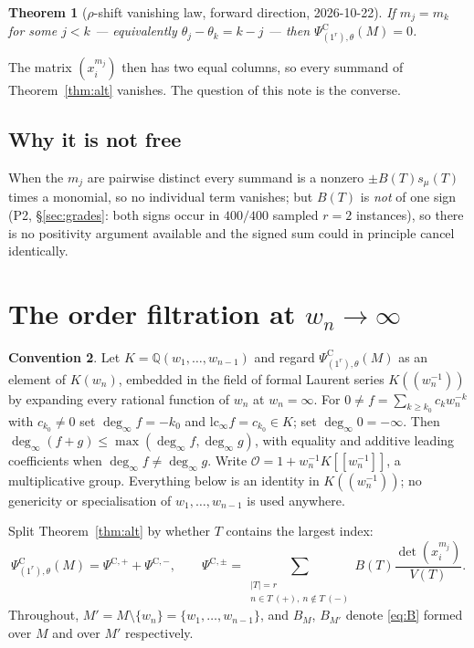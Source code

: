 \documentclass[11pt]{article}
\newtheorem{theorem}{Theorem}
\theoremstyle{definition}
\newtheorem{convention}[theorem]{Convention}
\newcommand{\PsiC}{\Psi^{\mathrm{C}}}
\newcommand{\PsiCs}[1]{\Psi^{\mathrm{C},#1}}
\newcommand{\degi}{\deg_{\infty}}
\begin{document}
\begin{theorem}[$\rho$-shift vanishing law, forward direction, 2026-10-22]\label{thm:vanish}
If $m_j=m_k$ for some $j<k$ --- equivalently $\theta_j-\theta_k=k-j$ --- then
$\PsiC_{(1^r),\theta}(M)=0$.
\end{theorem}

\noindent The matrix $(x_i^{m_j})$ then has two equal columns, so every summand of
Theorem~\ref{thm:alt} vanishes. The question of this note is the converse.

\subsection{Why it is not free}

When the $m_j$ are pairwise distinct every summand is a nonzero $\pm B(T)s_\mu(T)$ times a
monomial, so no individual term vanishes; but $B(T)$ is \emph{not} of one sign
(P2, \S\ref{sec:grades}: both signs occur in $400/400$ sampled $r=2$ instances), so there is
no positivity argument available and the signed sum could in principle cancel identically.

\section{The order filtration at $w_n\to\infty$}

\begin{convention}\label{conv:ord}
Let $K=\mathbb{Q}(w_1,\dots,w_{n-1})$ and regard $\PsiC_{(1^r),\theta}(M)$ as an element of
$K(w_n)$, embedded in the field of formal Laurent series $K((w_n^{-1}))$ by expanding every
rational function of $w_n$ at $w_n=\infty$. For $0\ne f=\sum_{k\ge k_0}c_kw_n^{-k}$ with
$c_{k_0}\ne0$ set $\degi f=-k_0$ and $\mathrm{lc}_\infty f=c_{k_0}\in K$; set
$\degi 0=-\infty$. Then $\degi(f+g)\le\max(\degi f,\degi g)$, with equality and additive
leading coefficients when $\degi f\neq\degi g$. Write $\mathcal{O}=1+w_n^{-1}K[[w_n^{-1}]]$,
a multiplicative group. Everything below is an identity in $K((w_n^{-1}))$; no genericity
or specialisation of $w_1,\dots,w_{n-1}$ is used anywhere.
\end{convention}

Split Theorem~\ref{thm:alt} by whether $T$ contains the largest index:
\[
  \PsiC_{(1^r),\theta}(M)=\PsiCs{+}+\PsiCs{-},\qquad
  \PsiCs{\pm}=\sum_{\substack{|T|=r\\ n\in T\ (+),\ n\notin T\ (-)}}
    B(T)\frac{\det(x_i^{m_j})}{V(T)} .
\]
Throughout, $M'=M\setminus\{w_n\}=\{w_1,\dots,w_{n-1}\}$, and $B_{M}$, $B_{M'}$ denote
\eqref{eq:B} formed over $M$ and over $M'$ respectively.
\end{document}
